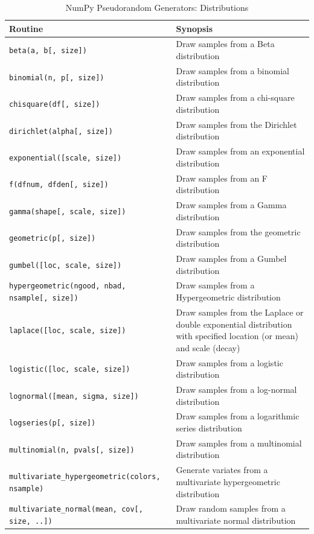 \documentclass[a4paper,11pt]{book}
\begin{document}
\begin{table}
	\centering
	\caption{NumPy Pseudorandom Generators: Distributions} 
	\label{tab:random_distros}
	\begin{tabular}{lp{12cm}}
		\toprule \toprule
			Routine & Synopsis \\
			\midrule
\texttt{beta(a, b[, size])} &
                        Draw samples from a Beta distribution\\
\texttt{binomial(n, p[, size])} &
                        Draw samples from a binomial distribution\\
\texttt{chisquare(df[, size])} &
                        Draw samples from a chi-square distribution\\
\texttt{dirichlet(alpha[, size])} &
                        Draw samples from the Dirichlet distribution\\
\texttt{exponential([scale, size])} &
                        Draw samples from an exponential distribution\\
\texttt{f(dfnum, dfden[, size])} &
                        Draw samples from an F distribution\\
\texttt{gamma(shape[, scale, size])} &
                        Draw samples from a Gamma distribution\\
\texttt{geometric(p[, size])} &
                        Draw samples from the geometric distribution\\
\texttt{gumbel([loc, scale, size])} &
                        Draw samples from a Gumbel distribution\\
\texttt{hypergeometric(ngood, nbad, nsample[, size])} &
                        Draw samples from a Hypergeometric distribution\\
\texttt{laplace([loc, scale, size])} &
                        Draw samples from the Laplace or double exponential distribution with specified location (or mean) and scale (decay)\\
\texttt{logistic([loc, scale, size])} &
                        Draw samples from a logistic distribution\\
\texttt{lognormal([mean, sigma, size])} &
                        Draw samples from a log-normal distribution\\
\texttt{logseries(p[, size])} &
                        Draw samples from a logarithmic series distribution\\
\texttt{multinomial(n, pvals[, size])} &
                        Draw samples from a multinomial distribution\\
\texttt{multivariate\_hypergeometric(colors, nsample)} &
                        Generate variates from a multivariate hypergeometric distribution\\
\texttt{multivariate\_normal(mean, cov[, size, ..])} &
                        Draw random samples from a multivariate normal distribution\\
\midrule
		\end{tabular}
\end{table}
\end{document}
